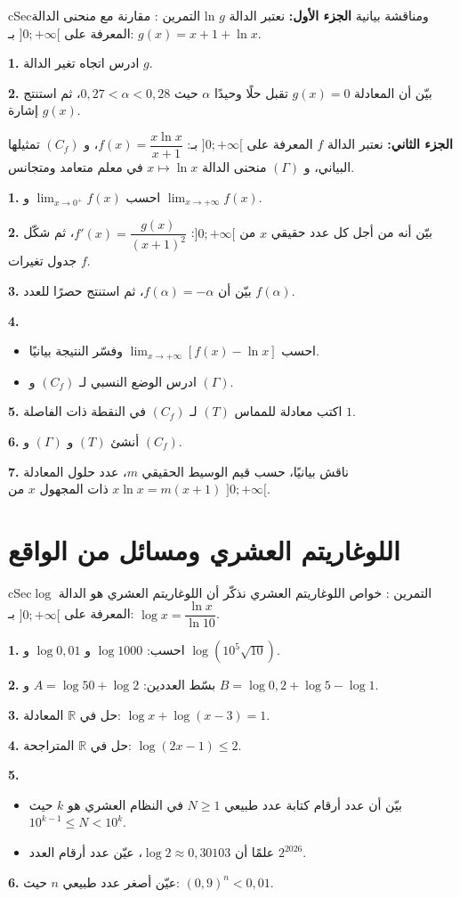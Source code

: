 \documentclass[12pt,a4paper]{article}
\newenvironment{BOX}[2]{\begin{otherlanguage}{english}\begin{arbox}{#1}{#2}}{\end{arbox}\end{otherlanguage}}
\newcounter{exo}
\newenvironment{tamrin}[1]{\stepcounter{exo}\begin{BOX}{cSec}{التمرين \theexo: #1}}{\end{BOX}}
\newcommand{\R}{\mathbb{R}}
\newenvironment{sq}{\begin{itemize}[leftmargin=2.4em,itemsep=3pt]}{\end{itemize}}
\newcommand{\qa}{\item[(أ)]}\newcommand{\qb}{\item[(ب)]}\newcommand{\qc}{\item[(جـ)]}\newcommand{\qd}{\item[(د)]}\newcommand{\qe}{\item[(هـ)]}
\newcommand{\QQ}[1]{\par\smallskip\textbf{#1.} }
\begin{document}
\begin{tamrin}{مقارنة مع منحنى الدالة ln ومناقشة بيانية}
\textbf{الجزء الأول:} نعتبر الدالة $g$ المعرفة على $]0;+\infty[$ بـ: $g(x)=x+1+\ln x$.
\QQ{1} ادرس اتجاه تغير الدالة $g$.
\QQ{2} بيّن أن المعادلة $g(x)=0$ تقبل حلًا وحيدًا $\alpha$ حيث $0{,}27<\alpha<0{,}28$، ثم استنتج إشارة $g(x)$.

\textbf{الجزء الثاني:} نعتبر الدالة $f$ المعرفة على $]0;+\infty[$ بـ: $f(x)=\dfrac{x\ln x}{x+1}$، و $(C_f)$ تمثيلها البياني، و $(\Gamma)$ منحنى الدالة $x\mapsto\ln x$ في معلم متعامد ومتجانس.
\QQ{1} احسب $\displaystyle\lim_{x\to0^{+}}f(x)$ و $\displaystyle\lim_{x\to+\infty}f(x)$.
\QQ{2} بيّن أنه من أجل كل عدد حقيقي $x$ من $]0;+\infty[$: $f'(x)=\dfrac{g(x)}{(x+1)^2}$، ثم شكّل جدول تغيرات $f$.
\QQ{3} بيّن أن $f(\alpha)=-\alpha$، ثم استنتج حصرًا للعدد $f(\alpha)$.
\QQ{4}
\begin{sq}
\qa احسب $\displaystyle\lim_{x\to+\infty}\left[f(x)-\ln x\right]$ وفسّر النتيجة بيانيًا.
\qb ادرس الوضع النسبي لـ $(C_f)$ و $(\Gamma)$.
\end{sq}
\QQ{5} اكتب معادلة للمماس $(T)$ لـ $(C_f)$ في النقطة ذات الفاصلة $1$.
\QQ{6} أنشئ $(T)$ و $(\Gamma)$ و $(C_f)$.
\QQ{7} ناقش بيانيًا، حسب قيم الوسيط الحقيقي $m$، عدد حلول المعادلة $x\ln x=m(x+1)$ ذات المجهول $x$ من $]0;+\infty[$.
\end{tamrin}

\section{اللوغاريتم العشري ومسائل من الواقع}

\begin{tamrin}{خواص اللوغاريتم العشري}
نذكّر أن اللوغاريتم العشري هو الدالة $\log$ المعرفة على $]0;+\infty[$ بـ: $\log x=\dfrac{\ln x}{\ln10}$.
\QQ{1} احسب: $\log1000$ \quad و \quad $\log0{,}01$ \quad و \quad $\log\left(10^5\sqrt{10}\right)$.
\QQ{2} بسّط العددين: $A=\log50+\log2$ \quad و \quad $B=\log0{,}2+\log5-\log1$.
\QQ{3} حل في $\R$ المعادلة: $\log x+\log(x-3)=1$.
\QQ{4} حل في $\R$ المتراجحة: $\log(2x-1)\leqslant2$.
\QQ{5}
\begin{sq}
\qa بيّن أن عدد أرقام كتابة عدد طبيعي $N\geqslant1$ في النظام العشري هو $k$ حيث $10^{k-1}\leqslant N<10^{k}$.
\qb علمًا أن $\log2\approx0{,}30103$، عيّن عدد أرقام العدد $2^{2026}$.
\end{sq}
\QQ{6} عيّن أصغر عدد طبيعي $n$ حيث: $(0{,}9)^n<0{,}01$.
\end{tamrin}
\end{document}
